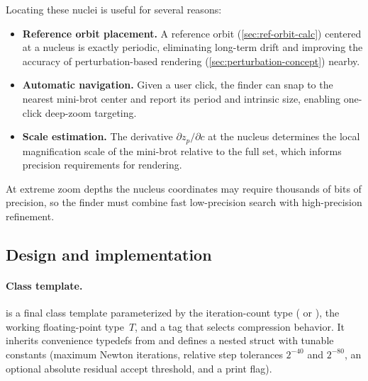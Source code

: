 Locating these nuclei is useful for several reasons:
\begin{itemize}
\item \textbf{Reference orbit placement.}  A reference orbit (\cref{sec:ref-orbit-calc}) centered at a
  nucleus is exactly periodic, eliminating long-term drift and improving the
  accuracy of perturbation-based rendering (\cref{sec:perturbation-concept}) nearby.
\item \textbf{Automatic navigation.}  Given a user click, the finder can snap
  to the nearest mini-brot center and report its period and intrinsic size,
  enabling one-click deep-zoom targeting.
\item \textbf{Scale estimation.}  The derivative $\partial z_p/\partial c$ at
  the nucleus determines the local magnification scale of the mini-brot
  relative to the full set, which informs precision requirements for rendering.
\end{itemize}
At extreme zoom depths the nucleus coordinates may require thousands of bits of
precision, so the finder must combine fast low-precision search with
high-precision refinement.

\subsection{Design and implementation}
\label{subsec:ff-design}

\paragraph{Class template.}
 is a final class template
parameterized by the iteration-count type ( or
), the working floating-point type~$T$, and a
 tag that selects compression behavior.  It inherits
convenience typedefs from  and defines a nested
 struct with tunable constants (maximum Newton iterations,
relative step tolerances $2^{-40}$ and $2^{-80}$, an optional absolute
residual accept threshold, and a print flag).

